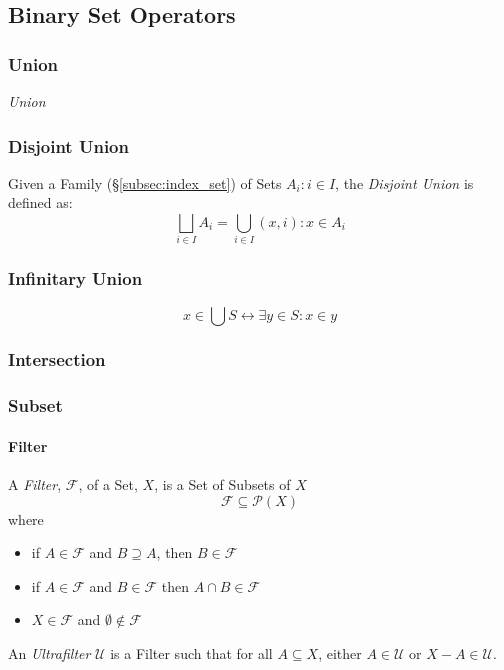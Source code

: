 \documentclass{article}
\begin{document}
\subsection{Binary Set Operators}

\subsubsection{Union}

\emph{Union}

\subsubsection{Disjoint Union}\label{subsec:disjoint_union}

Given a Family (\S\ref{subsec:index_set}) of Sets ${A_i : i \in I}$,
the \emph{Disjoint Union} is defined as:
\[
    \bigsqcup_{i \in I} A_i = \bigcup_{i \in I} {(x,i) : x \in A_i}
\]



\subsubsection{Infinitary Union}

\[
    x \in \bigcup S \leftrightarrow \exists y \in S : x \in y
\]



\subsubsection{Intersection}



\subsubsection{Subset}

\paragraph{Filter}

A \emph{Filter}, $\mathcal{F}$, of a Set, $X$, is a Set of Subsets of
$X$
\[
    \mathcal{F} \subseteq \mathcal{P}(X)
\]
where
\begin{itemize}
\item if $A \in \mathcal{F}$ and $B \supseteq A$, then $B \in
  \mathcal{F}$
\item if $A \in \mathcal{F}$ and $B \in \mathcal{F}$ then $A \cap B
  \in \mathcal{F}$
\item $X \in \mathcal{F}$ and $\emptyset \notin \mathcal{F}$
\end{itemize}
An \emph{Ultrafilter} $\mathcal{U}$ is a Filter such that for all $A
\subseteq X$, either $A \in \mathcal{U}$ or $X - A \in \mathcal{U}$.
\end{document}

